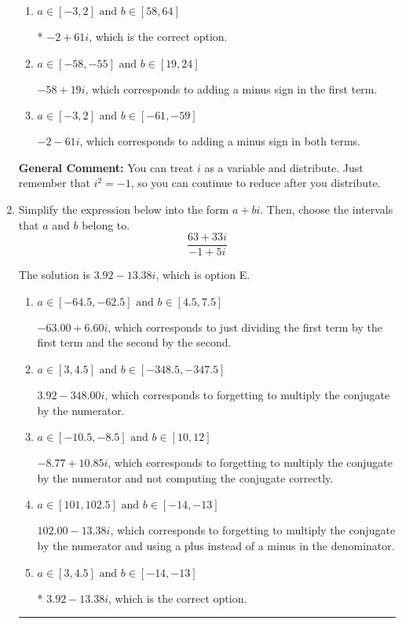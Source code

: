 \documentclass{extbook}[14pt]
\newcommand{\litem}[1]{\item #1

\rule{\textwidth}{0.4pt}}
\begin{document}
\begin{enumerate}
{\begin{enumerate}[label=\Alph*.]
 $-30 - 28 i$, which corresponds to just multiplying the real terms to get the real part of the solution and the coefficients in the complex terms to get the complex part.
\item \( a \in [-3, 2] \text{ and } b \in [58, 64] \)

* $-2 + 61 i$, which is the correct option.
\item \( a \in [-58, -55] \text{ and } b \in [19, 24] \)

 $-58 + 19 i$, which corresponds to adding a minus sign in the first term.
\item \( a \in [-3, 2] \text{ and } b \in [-61, -59] \)

 $-2 - 61 i$, which corresponds to adding a minus sign in both terms.
\end{enumerate}

\textbf{General Comment:} You can treat $i$ as a variable and distribute. Just remember that $i^2=-1$, so you can continue to reduce after you distribute.
}
\litem{
Simplify the expression below into the form $a+bi$. Then, choose the intervals that $a$ and $b$ belong to.
\[ \frac{63 + 33 i}{-1 + 5 i} \]

The solution is \( 3.92  - 13.38 i \), which is option E.\begin{enumerate}[label=\Alph*.]
\item \( a \in [-64.5, -62.5] \text{ and } b \in [4.5, 7.5] \)

 $-63.00  + 6.60 i$, which corresponds to just dividing the first term by the first term and the second by the second.
\item \( a \in [3, 4.5] \text{ and } b \in [-348.5, -347.5] \)

 $3.92  - 348.00 i$, which corresponds to forgetting to multiply the conjugate by the numerator.
\item \( a \in [-10.5, -8.5] \text{ and } b \in [10, 12] \)

 $-8.77  + 10.85 i$, which corresponds to forgetting to multiply the conjugate by the numerator and not computing the conjugate correctly.
\item \( a \in [101, 102.5] \text{ and } b \in [-14, -13] \)

 $102.00  - 13.38 i$, which corresponds to forgetting to multiply the conjugate by the numerator and using a plus instead of a minus in the denominator.
\item \( a \in [3, 4.5] \text{ and } b \in [-14, -13] \)

* $3.92  - 13.38 i$, which is the correct option.
\end{enumerate}

}
\end{enumerate}
\end{document}
